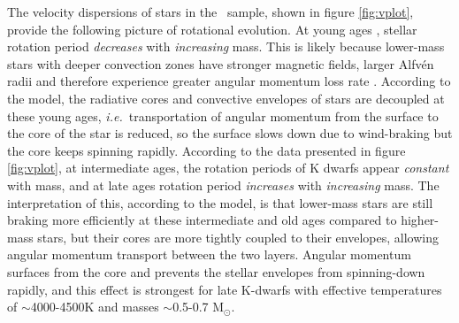 \documentclass{aastex63}
\newcommand{\ie}{{\it i.e.}}
\newcommand{\eg}{{\it e.g.}}
\newcommand{\mct}{\citet{mcquillan2014}}
\newcommand{\racomment}[1]{{\color{blue}#1}}
\begin{document}
The velocity dispersions of stars in the \mct\ sample, shown in figure
\ref{fig:vplot}, provide the following picture of rotational evolution.
At young ages \citep[younger than around 1 Gyr but still old enough to be on
the main sequence and have transitioned from the `C' sequence to the `I'
sequence ][]{barnes2003}, stellar rotation period {\it decreases} with {\it
increasing} mass.
This is likely because lower-mass stars with deeper convection zones have
stronger magnetic fields, larger Alfv\'en radii and therefore experience
greater angular momentum loss rate \citep[\eg][]{schatzman1962, kraft1967,
parker1970, kawaler1988, charbonneau2010, matt2012, matt2015}.
According to the \citet{spada2019} model, the radiative cores and convective
envelopes of stars are decoupled at these young ages, \ie\ transportation of
angular momentum from the surface to the core of the star is reduced, so the
surface slows down due to wind-braking but the core keeps spinning rapidly.
According to the data presented in figure \ref{fig:vplot}, at intermediate
ages, the rotation periods of K dwarfs appear {\it constant} with mass, and at
late ages rotation period {\it increases} with {\it increasing} mass.
The interpretation of this, according to the \citet{spada2019} model, is that
lower-mass stars are still braking more efficiently at these intermediate and
old ages \racomment{compared to higher-mass stars}, but their cores are more
tightly coupled to their envelopes, allowing angular momentum transport
between the two layers.
Angular momentum surfaces \racomment{from the core} and prevents the stellar
envelopes from spinning-down rapidly, and this effect is strongest for late
K-dwarfs with effective temperatures of $\sim$4000-4500K and masses
$\sim$0.5-0.7 M$_\odot$.
\end{document}
